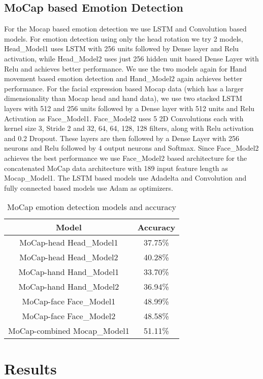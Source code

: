 \documentclass{article}
\begin{document}
\subsection{MoCap based Emotion Detection}
For the Mocap based emotion detection we use LSTM and Convolution based models. For emotion detection using only the head rotation we try 2 models, Head\_Model1 uses LSTM with 256 units followed by Dense layer and Relu activation, while Head\_Model2 uses just 256 hidden unit based Dense Layer with Relu and achieves better performance. We use the two models again for Hand movement based emotion detection and Hand\_Model2 again achieves better performance. For the facial expression based Mocap data (which has a larger dimensionality than Mocap head and hand data), we use two stacked LSTM layers with 512 and 256 units followed by a Dense layer with 512 units and Relu Activation as Face\_Model1. Face\_Model2 uses 5 2D Convolutions each with kernel size 3, Stride 2 and 32, 64, 64, 128, 128 filters, along with Relu activation and 0.2 Dropout. These layers are then followed by a Dense Layer with 256 neurons and Relu followed by 4 output neurons and Softmax. Since Face\_Model2 achieves the best performance we use Face\_Model2 based architecture for the concatenated MoCap data architecture with 189 input feature length as Mocap\_Model1. The LSTM based models use Adadelta and Convolution and fully connected based models use Adam as optimizers.

\begin{table}[!t]
\renewcommand{\arraystretch}{1.3}
\caption{MoCap emotion detection models and accuracy}
\label{table_mocap}
\centering
\begin{tabular}{|c||c|}
\hline
Model & Accuracy\\
\hline
MoCap-head Head\_Model1 & 37.75\% \\
MoCap-head Head\_Model2 & 40.28\% \\
\hline
MoCap-hand Hand\_Model1 & 33.70\% \\
MoCap-hand Hand\_Model2 & 36.94\% \\
\hline
MoCap-face Face\_Model1 & 48.99\% \\
MoCap-face Face\_Model2 & 48.58\% \\
\hline
MoCap-combined Mocap\_Model1 & 51.11\% \\
\hline
\end{tabular}
\end{table}

\section{Results}
\label{sec:models}
\end{document}
